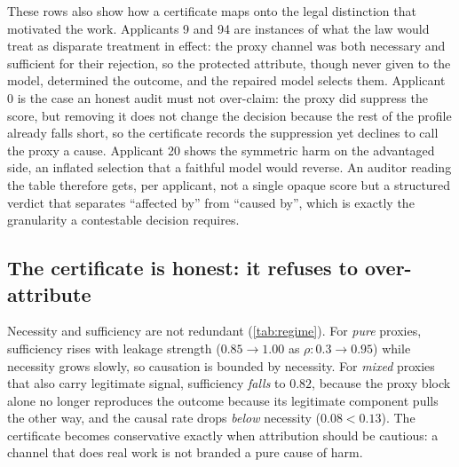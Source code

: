 \documentclass[sn-mathphys-num]{sn-jnl}
\begin{document}
These rows also show how a certificate maps onto the legal distinction that
motivated the work. Applicants 9 and 94 are instances of what the law would treat
as disparate treatment in effect: the proxy channel was both necessary and
sufficient for their rejection, so the protected attribute, though never given to
the model, determined the outcome, and the repaired model selects them. Applicant
0 is the case an honest audit must not over-claim: the proxy did suppress the
score, but removing it does not change the decision because the rest of the profile
already falls short, so the certificate records the suppression yet declines to
call the proxy a cause. Applicant 20 shows the symmetric harm on the advantaged
side, an inflated selection that a faithful model would reverse. An auditor reading
the table therefore gets, per applicant, not a single opaque score but a structured
verdict that separates ``affected by'' from ``caused by'', which is exactly the
granularity a contestable decision requires.

\subsection{The certificate is honest: it refuses to over-attribute}
\label{sec:results-honest}
Necessity and sufficiency are not redundant (\cref{tab:regime}). For
\emph{pure} proxies, sufficiency rises with leakage strength
($0.85\!\to\!1.00$ as $\rho:0.3\!\to\!0.95$) while necessity grows slowly, so
causation is bounded by necessity. For \emph{mixed} proxies that also carry
legitimate signal, sufficiency \emph{falls} to $0.82$, because the proxy block alone no
longer reproduces the outcome because its legitimate component pulls the other
way, and the causal rate drops \emph{below} necessity ($0.08<0.13$). The
certificate becomes conservative exactly when attribution should be cautious: a
channel that does real work is not branded a pure cause of harm.
\end{document}
